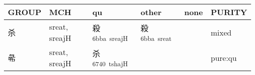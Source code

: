 \documentclass[14pt,a4paper]{scrartcl}
\begin{document}
\begin{longtable}[c]{@{}llllll@{}}
\toprule
\begin{minipage}[b]{0.14\columnwidth}\raggedright\strut
GROUP
\strut\end{minipage} &
\begin{minipage}[b]{0.14\columnwidth}\raggedright\strut
MCH
\strut\end{minipage} &
\begin{minipage}[b]{0.14\columnwidth}\raggedright\strut
qu
\strut\end{minipage} &
\begin{minipage}[b]{0.14\columnwidth}\raggedright\strut
other
\strut\end{minipage} &
\begin{minipage}[b]{0.14\columnwidth}\raggedright\strut
none
\strut\end{minipage} &
\begin{minipage}[b]{0.14\columnwidth}\raggedright\strut
PURITY
\strut\end{minipage}\tabularnewline
\midrule
\endhead
\begin{minipage}[t]{0.14\columnwidth}\raggedright\strut
杀
\strut\end{minipage} &
\begin{minipage}[t]{0.14\columnwidth}\raggedright\strut
sreat, sreajH
\strut\end{minipage} &
\begin{minipage}[t]{0.14\columnwidth}\raggedright\strut
殺\textsuperscript{6bba~sreajH}
\strut\end{minipage} &
\begin{minipage}[t]{0.14\columnwidth}\raggedright\strut
殺\textsuperscript{6bba~sreat}
\strut\end{minipage} &
\begin{minipage}[t]{0.14\columnwidth}\raggedright\strut
\strut\end{minipage} &
\begin{minipage}[t]{0.14\columnwidth}\raggedright\strut
mixed
\strut\end{minipage}\tabularnewline
\begin{minipage}[t]{0.14\columnwidth}\raggedright\strut
㣇
\strut\end{minipage} &
\begin{minipage}[t]{0.14\columnwidth}\raggedright\strut
sreat, sreajH
\strut\end{minipage} &
\begin{minipage}[t]{0.14\columnwidth}\raggedright\strut
杀\textsuperscript{6740~tshajH}
\strut\end{minipage} &
\begin{minipage}[t]{0.14\columnwidth}\raggedright\strut
\strut\end{minipage} &
\begin{minipage}[t]{0.14\columnwidth}\raggedright\strut
\strut\end{minipage} &
\begin{minipage}[t]{0.14\columnwidth}\raggedright\strut
pure:qu
\strut\end{minipage}\tabularnewline
\bottomrule
\end{longtable}
\end{document}
